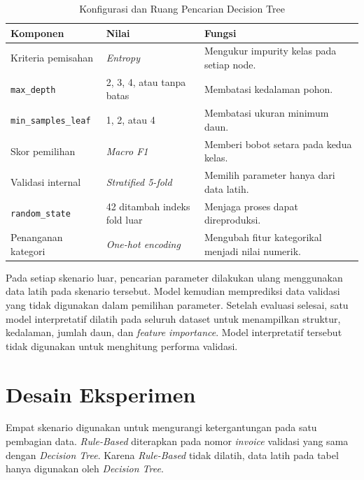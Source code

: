 \begin{table}[htbp]
    \centering
    \caption{Konfigurasi dan Ruang Pencarian Decision Tree}
    \label{tab:parameter-decision-tree}
    \small
    \renewcommand{\arraystretch}{1.2}
    \begin{tabularx}{\textwidth}{p{}p{}X}
        \toprule
        \textbf{Komponen} & \textbf{Nilai} & \textbf{Fungsi} \\
        \midrule
        Kriteria pemisahan & \textit{Entropy} & Mengukur impurity kelas pada setiap node. \\
        \texttt{max\_depth} & 2, 3, 4, atau tanpa batas & Membatasi kedalaman pohon. \\
        \texttt{min\_samples\_leaf} & 1, 2, atau 4 & Membatasi ukuran minimum daun. \\
        Skor pemilihan & \textit{Macro F1} & Memberi bobot setara pada kedua kelas. \\
        Validasi internal & \textit{Stratified 5-fold} & Memilih parameter hanya dari data latih. \\
        \texttt{random\_state} & 42 ditambah indeks fold luar & Menjaga proses dapat direproduksi. \\
        Penanganan kategori & \textit{One-hot encoding} & Mengubah fitur kategorikal menjadi nilai numerik. \\
        \bottomrule
    \end{tabularx}
\end{table}

Pada setiap skenario luar, pencarian parameter dilakukan ulang menggunakan data latih pada skenario tersebut. Model kemudian memprediksi data validasi yang tidak digunakan dalam pemilihan parameter. Setelah evaluasi selesai, satu model interpretatif dilatih pada seluruh dataset untuk menampilkan struktur, kedalaman, jumlah daun, dan \textit{feature importance}. Model interpretatif tersebut tidak digunakan untuk menghitung performa validasi.

\FloatBarrier

\section{Desain Eksperimen}

Empat skenario digunakan untuk mengurangi ketergantungan pada satu pembagian data. \textit{Rule-Based} diterapkan pada nomor \textit{invoice} validasi yang sama dengan \textit{Decision Tree}. Karena \textit{Rule-Based} tidak dilatih, data latih pada tabel hanya digunakan oleh \textit{Decision Tree}.

